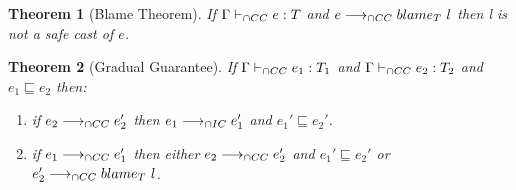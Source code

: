 \documentclass[a4paper]{article}
\newtheorem{theorem}{Theorem}
\begin{document}
\begin{theorem}[Blame Theorem]
\label{blame_theorem}
If $\Gamma \vdash_{\cap CC} e : T$ and $e \longrightarrow_{\cap CC} blame_{T}\ l$ then l is not a safe cast of $e$.
\end{theorem}

\begin{theorem}[Gradual Guarantee]
\label{gradual_guarantee}
If $\Gamma \vdash_{\cap CC} e_1 : T_1$ and $\Gamma \vdash_{\cap CC} e_2 : T_2$ and $e_1 \sqsubseteq e_2$ then:
\begin{enumerate}
    \item if $e_2 \longrightarrow_{\cap CC} e_2'$ then $e_1 \longrightarrow_{\cap IC} e_1'$ and $e_1' \sqsubseteq e_2'$.
    \item if $e_1 \longrightarrow_{\cap CC} e_1'$ then either $e_2 \longrightarrow_{\cap CC} e_2'$ and $e_1' \sqsubseteq e_2'$ or $e_2' \longrightarrow_{\cap CC} blame_{T}\ l$.
\end{enumerate}
\end{theorem}



\end{document}
